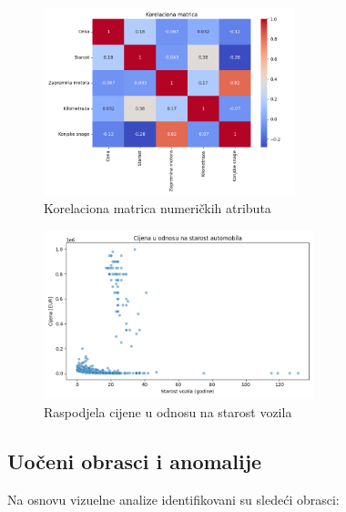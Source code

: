 \documentclass[a4paper,12pt]{article}
\begin{document}
\begin{figure}[H]
    \centering
    \includegraphics[width=0.65\textwidth]{corr_matrix.png}
    \caption{Korelaciona matrica numeričkih atributa}
    \label{fig:corr_matrix}
\end{figure}

\begin{figure}[H]
    \centering
    \includegraphics[width=0.7\textwidth]{scatter_starost_vs_cena.png}
    \caption{Raspodjela cijene u odnosu na starost vozila}
    \label{fig:starost_vs_cena}
\end{figure}

\subsection{Uočeni obrasci i anomalije}

Na osnovu vizuelne analize identifikovani su sledeći obrasci:
\end{document}
